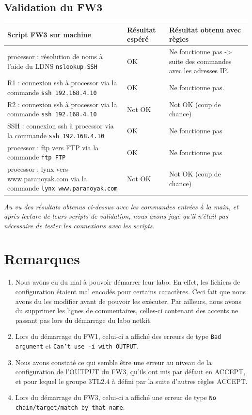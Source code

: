 \documentclass[11pt,a4paper]{article}
\begin{document}
\subsection{Validation du FW3}
\begin{longtable}{|p{8cm}|p{3cm}|p{3cm}|}
\hline
Script FW3 sur machine & Résultat espéré & Résultat obtenu avec règles\\
\hline 
processor : résolution de noms à l'aide du LDNS \texttt{nslookup SSH} & OK & Ne fonctionne pas -> suite des commandes avec les adresses IP. \\
\hline
R1 : connexion ssh à processor via la commande \texttt{ssh 192.168.4.10} & OK & Ne fonctionne pas. \\
\hline
R2 : connexion ssh à processor via la commande \texttt{ssh 192.168.4.10} & Not OK & Not OK (coup de chance) \\
\hline
SSH : connexion ssh à processor via la commande \texttt{ssh 192.168.4.10} & OK & Ne fonctionne pas \\
\hline
processor : ftp vers FTP via la commande \texttt{ftp FTP} & OK & Ne fonctionne pas  \\
\hline
processor : lynx vers www.paranoyak.com via la commande \texttt{lynx www.paranoyak.com} & Not OK & Not OK (coup de chance)\\
\hline
\end{longtable}
\emph{Au vu des résultats obtenus ci-dessus avec les commandes entrées à la main, et après lecture de leurs scripts de validation, nous avons jugé qu'il n'était pas nécessaire de tester les connexions avec les scripts.}

\section{Remarques}
\begin{enumerate}
\item Nous avons eu du mal à pouvoir démarrer leur labo. En effet, les fichiers de configuration étaient mal encodés pour certains caractères. Ceci fait que nous avons du les modifier avant de pouvoir les exécuter. Par ailleurs, nous avons du supprimer les lignes de commentaires, celles-ci contenant des accents ne passant pas lors du démarrage du labo netkit.
\item Lors du démarrage du FW1, celui-ci a affiché des erreurs de type \texttt{Bad argument} et \texttt{Can't use -i with OUTPUT}.

\item Nous avons constaté ce qui semble être une erreur au niveau de la configuration de l'OUTPUT du FW3, qu'ils ont mis par défaut en ACCEPT, et pour lequel le groupe 3TL2.4 à défini par la suite d'autres règles ACCEPT.
\item Lors du démarrage du FW3, celui-ci a affiché une erreur de type \texttt{No chain/target/match by that name}.
\end{enumerate}
\end{document}
